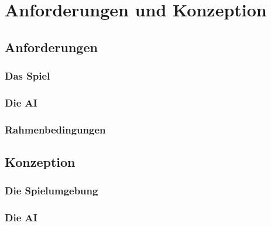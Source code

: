 \section{Anforderungen und Konzeption}
\subsection{Anforderungen}
\subsubsection{Das Spiel}
\subsubsection{Die AI}
\subsubsection{Rahmenbedingungen}
\subsection{Konzeption}
\subsubsection{Die Spielumgebung}
\subsubsection{Die AI}